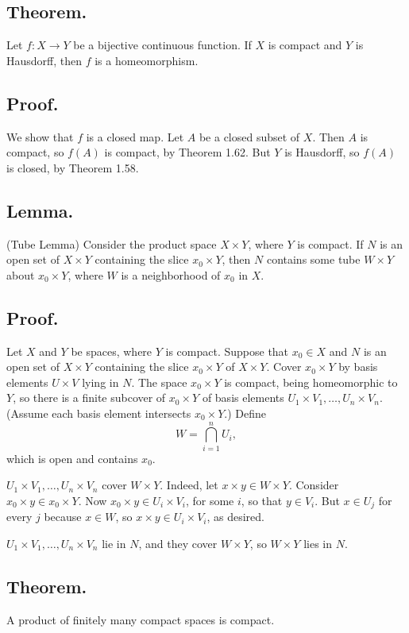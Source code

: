 \documentclass[titlepage]{article}
\begin{document}
\subsection{Theorem.} Let $f: X \to Y$ be a bijective continuous function. If $X$ is compact and $Y$ is Hausdorff, then $f$ is a homeomorphism.

\subsection{Proof.} We show that $f$ is a closed map. Let $A$ be a closed subset of $X$. Then $A$ is compact, so $f(A)$ is compact, by Theorem 1.62. But $Y$ is Hausdorff, so $f(A)$ is closed, by Theorem 1.58.

\subsection{Lemma.} (Tube Lemma) Consider the product space $X \times Y$, where $Y$ is compact. If $N$ is an open set of $X \times Y$ containing the slice $x_{0} \times Y$, then $N$ contains some tube $W \times Y$ about $x_{0} \times Y$, where $W$ is a neighborhood of $x_{0}$ in $X$.

\subsection{Proof.} Let $X$ and $Y$ be spaces, where $Y$ is compact. Suppose that $x_{0} \in X$ and $N$ is an open set of $X \times Y$ containing the slice $x_{0} \times Y$ of $X \times Y$. Cover $x_{0} \times Y$ by basis elements $U \times V$ lying in $N$. The space $x_{0} \times Y$ is compact, being homeomorphic to $Y$, so there is a finite subcover of $x_{0} \times Y$ of basis elements $U_{1} \times V_{1}, \ldots, U_{n} \times V_{n}$. (Assume each basis element intersects $x_{0} \times Y$.) Define 
$$W = \bigcap_{i=1}^{n} U_{i},$$
which is open and contains $x_{0}$.

$U_{1} \times V_{1}, \ldots, U_{n} \times V_{n}$ cover $W \times Y$. Indeed, let $x \times y \in W \times Y$. Consider $x_{0} \times y \in x_{0} \times Y$. Now $x_{0} \times y \in U_{i} \times V_{i}$, for some $i$, so that $y \in V_{i}$. But $x \in U_{j}$ for every $j$ because $x \in W$, so $x \times y \in U_{i} \times V_{i}$, as desired.

$U_{1} \times V_{1}, \ldots, U_{n} \times V_{n}$ lie in $N$, and they cover $W \times Y$, so $W \times Y$ lies in $N$.

\subsection{Theorem.} A product of finitely many compact spaces is compact.
\end{document}
